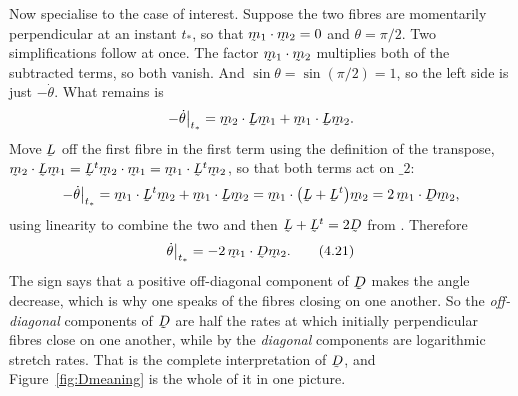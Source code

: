 Now specialise to the case of interest. Suppose the two fibres are
momentarily perpendicular at an instant $t_{*}$, so that
$\ip{\bm_{1}}{\bm_{2}}=0$ and $\theta=\pi/2$. Two simplifications follow
at once. The factor $\ip{\bm_{1}}{\bm_{2}}$ multiplies both of the
subtracted terms, so both vanish. And $\sin\theta=\sin(\pi/2)=1$, so the
left side is just $-\dot\theta$. What remains is
\[
   -\dot\theta\big|_{t_{*}}
   =\ip{\bm_{2}}{\bL\bm_{1}}+\ip{\bm_{1}}{\bL\bm_{2}} .
\]
Move $\bL$ off the first fibre in the first term using the definition of
the transpose, $\ip{\bm_{2}}{\bL\bm_{1}}=\ip{\bL^{t}\bm_{2}}{\bm_{1}}
=\ip{\bm_{1}}{\bL^{t}\bm_{2}}$, so that both terms act on $\bm_{2}$:
\[
   -\dot\theta\big|_{t_{*}}
   =\ip{\bm_{1}}{\bL^{t}\bm_{2}}+\ip{\bm_{1}}{\bL\bm_{2}}
   =\ip{\bm_{1}}{\big(\bL+\bL^{t}\big)\bm_{2}}
   =2\,\ip{\bm_{1}}{\bD\bm_{2}},
\]
using linearity to combine the two and then $\bL+\bL^{t}=2\bD$ from
. Therefore
\begin{equation}
   \dot\theta\big|_{t_{*}}
   =-2\,\ip{\bm_{1}}{\bD\bm_{2}} .
   \tag{4.21}\label{eq:4.21}
\end{equation}
The sign says that a positive off-diagonal component of $\bD$ makes the
angle decrease, which is why one speaks of the fibres closing on one
another. So the
\emph{off-diagonal} components of $\bD$ are half the rates at which
initially perpendicular fibres close on one another, while by  the
\emph{diagonal} components are logarithmic stretch rates. That is the
complete interpretation of $\bD$, and Figure~\ref{fig:Dmeaning} is the
whole of it in one picture.

